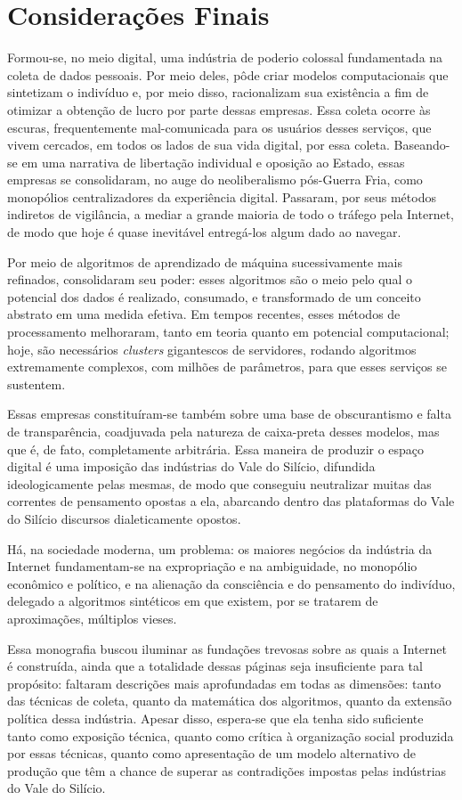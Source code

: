 \chapter*{Considerações Finais}
Formou-se, no meio digital, uma indústria de poderio colossal fundamentada na coleta de dados pessoais.
Por meio deles, pôde criar modelos computacionais que sintetizam o indivíduo e, por meio disso, racionalizam sua existência a fim de otimizar a obtenção de lucro por parte dessas empresas.
Essa coleta ocorre às escuras, frequentemente mal-comunicada para os usuários desses serviços, que vivem cercados, em todos os lados de sua vida digital, por essa coleta.
Baseando-se em uma narrativa de libertação individual e oposição ao Estado, essas empresas se consolidaram, no auge do neoliberalismo pós-Guerra Fria, como monopólios centralizadores da experiência digital.
Passaram, por seus métodos indiretos de vigilância, a mediar a grande maioria de todo o tráfego pela Internet, de modo que hoje é quase inevitável entregá-los algum dado ao navegar.

Por meio de algoritmos de aprendizado de máquina sucessivamente mais refinados, consolidaram seu poder: esses algoritmos são o meio pelo qual o potencial dos dados é realizado, consumado, e transformado de um conceito abstrato em uma medida efetiva.
Em tempos recentes, esses métodos de processamento melhoraram, tanto em teoria quanto em potencial computacional; hoje, são necessários \textit{clusters} gigantescos de servidores, rodando algoritmos extremamente complexos, com milhões de parâmetros, para que esses serviços se sustentem.

Essas empresas constituíram-se também sobre uma base de obscurantismo e falta de transparência, coadjuvada pela natureza de caixa-preta desses modelos, mas que é, de fato, completamente arbitrária.
Essa maneira de produzir o espaço digital é uma imposição das indústrias do Vale do Silício, difundida ideologicamente pelas mesmas, de modo que conseguiu neutralizar muitas das correntes de pensamento opostas a ela, abarcando dentro das plataformas do Vale do Silício discursos dialeticamente opostos.

Há, na sociedade moderna, um problema: os maiores negócios da indústria da Internet fundamentam-se na expropriação e na ambiguidade, no monopólio econômico e político, e na alienação da consciência e do pensamento do indivíduo, delegado a algoritmos sintéticos em que existem, por se tratarem de aproximações, múltiplos vieses.

Essa monografia buscou iluminar as fundações trevosas sobre as quais a Internet é construída, ainda que a totalidade dessas páginas seja insuficiente para tal propósito: faltaram descrições mais aprofundadas em todas as dimensões: tanto das técnicas de coleta, quanto da matemática dos algoritmos, quanto da extensão política dessa indústria.
Apesar disso, espera-se que ela tenha sido suficiente tanto como exposição técnica, quanto como crítica à organização social produzida por essas técnicas, quanto como apresentação de um modelo alternativo de produção que têm a chance de superar as contradições impostas pelas indústrias do Vale do Silício.

